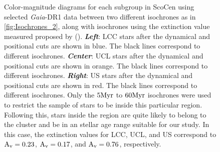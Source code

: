 \begin{figure}[!ht]
\centering
\caption{\scriptsize{Color-magnitude diagrams for each subgroup in ScoCen using selected \textit{Gaia}-DR1 data between two different isochrones as in \autoref{fig:Isochrones_2}, along with isochrones using the extinction value measured proposed by  (\citeyear{1989A&A...216...44D}). \textit{\textbf{Left}}: LCC stars after the dynamical and positional cuts are shown in blue. The black lines correspond to different isochrones. \textit{\textbf{Center}}: UCL stars after the dynamical and positional cuts are shown in orange. The black lines correspond to different isochrones. \textit{\textbf{Right}}: US stars after the dynamical and positional cuts are shown in red. The black lines correspond to different isochrones. Only the $5 \textnormal{Myr}$ to $60 \textnormal{Myr}$ isochrones were used to restrict the sample of stars to be inside this particular region. Following this, stars inside the region are quite likely to belong to the cluster and be in an stellar age range suitable for our study. In this case, the extinction values for LCC, UCL, and US correspond to $\textnormal{A}_\textnormal{v} = 0.23$, $\textnormal{A}_\textnormal{v} = 0.17$, and $\textnormal{A}_\textnormal{v} = 0.76$, respectively.}}
\label{fig:Isochrones_4}
\end{figure}

